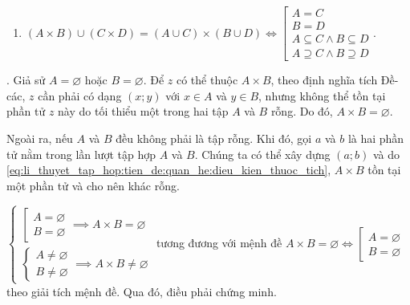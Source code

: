 \begin{enumerate}
   \setcounter{enumi}{\value{subexercise}}
   \item $(A \times B) \cup (C \times D) = (A \cup C) \times (B \cup D) \iff \left[\begin{array}{l}
      A = C \\
      B = D \\
      A \subseteq C \land B \subseteq D\\
      A \supseteq C \land B \supseteq D
   \end{array}\right.$.
\end{enumerate}

\solution

\setcounter{subexercise}{1}
. Giả sử $A = \varnothing$ hoặc $B = \varnothing$. Để $z$ có thể thuộc $A \times B$, theo định nghĩa tích Đề-các, $z$ cần phải có dạng $(x; y)$ với $x \in A$ và $y \in B$, nhưng không thể tồn tại phần tử $z$ này do tối thiểu một trong hai tập $A$ và $B$ rỗng. Do đó, $A \times B = \varnothing$.

Ngoài ra, nếu $A$ và $B$ đều không phải là tập rỗng. Khi đó, gọi $a$ và $b$ là hai phần tử nằm trong lần lượt tập hợp $A$ và $B$. Chúng ta có thể xây dựng $(a; b)$ và do \eqref{eq:li_thuyet_tap_hop:tien_de:quan_he:dieu_kien_thuoc_tich}, $A \times B$ tồn tại một phần tử và cho nên khác rỗng.

$\begin{cases}
   \left[\begin{array}{l}
      A = \varnothing \\ 
      B = \varnothing
   \end{array}\right. \implies A \times B = \varnothing \\
   \begin{cases}
      A \neq \varnothing \\
      B \neq \varnothing
   \end{cases} \implies A \times B \neq \varnothing
\end{cases}$ tương đương với mệnh đề $A \times B = \varnothing \iff \left[\begin{array}{l}
      A = \varnothing \\ 
      B = \varnothing
   \end{array}\right.$ theo giải tích mệnh đề. Qua đó, điều phải chứng minh.

